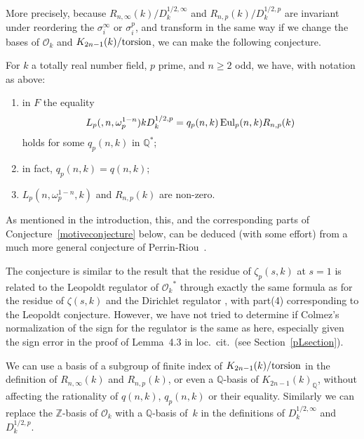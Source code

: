 \documentclass{amsart}
\begin{document}
More precisely, because $ R_{n,\infty}(k) / {D_k^{1/2,\infty}} $ and $ R_{n,p}(k) / {D_k^{1/2,p}} $
are invariant under reordering the $ {\sigma}_i^\infty $ or $ {\sigma}_i^p $, and
transform in the same way if we change the bases of $ {{\mathcal O}_k} $ and $ K_{2n-1}(k)/{\textup{torsion}} $, 
we can make the following conjecture.

\begin{conjecture}\label{pborel}
For $ k $ a totally real number field, $ p $ prime, and $ n \ge 2 $ odd, we have, with notation as above:
\begin{enumerate}

\item in $ F $ the equality
\[
{L_{p}(,n,\omega_p^{1-n})}k   D_k^{1/2,p}  =   q_p(n,k) \, {\textup{Eul}}_p(n,k) R_{n,p}(k) 
\]
holds for some $ q_p(n,k) $ in $ {\mathbb Q}^* $;
\item in fact, $ q_p(n,k) = q(n,k) $;
\item $ {L_{p}(n,\omega_p^{1-n},k)}$ and $ R_{n,p}(k) $ are non-zero.
\end{enumerate}
\end{conjecture}
As mentioned in the introduction, this, and the corresponding parts of Conjecture~\ref{motiveconjecture}
below, can be deduced (with some effort) from a much more general conjecture of Perrin-Riou~\cite[4.2.2]{Peri96}.

\begin{remark}
The conjecture is similar to the result that the residue of $ {\zeta}_p(s,k) $ at $ s=1 $
is related to the Leopoldt regulator of $ {{\mathcal O}_k}^* $ through exactly the same formula as for the residue of $ {\zeta}(s,k) $ and
the Dirichlet regulator \cite{Colm88}, with part(4) corresponding to the Leopoldt conjecture.  However,
we have not tried to determine if Colmez's normalization of the sign for the regulator is
the same as here, especially given the sign error in the proof of Lemma~4.3 in
loc.\ cit.\ (see Section~\ref{pLsection}).
\end{remark}

\begin{remark}\label{basisremark}
We can use a basis of a subgroup of finite index of $K_{2n-1}(k)/{\textup{torsion}} $ in the definition of $ R_{n,\infty}(k) $ and $ R_{n,p}(k) $,
or even a $ {\mathbb Q} $-basis of $ {K_{2n-1}(k)_{\mathbb Q}}$, without affecting the rationality of $ q(n,k) $, $ q_p(n,k) $ or
their equality.
Similarly we can replace the $ {\mathbb Z} $-basis of $ {{\mathcal O}_k} $ with a $ {\mathbb Q} $-basis of~$ k $ in the definitions of $ {D_k^{1/2,\infty}} $ and~$ {D_k^{1/2,p}} $.
\end{remark}
\end{document}
